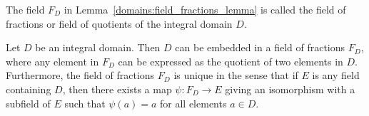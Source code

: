 \medskip

The field $F_D$ in Lemma~\ref{domains:field_fractions_lemma} is called the {\bfi field of
fractions\/} or {\bfi field of
quotients\/} of the integral domain $D$.  
 

\begin{theorem}\label{domains:field_of_quotients_ther}
Let $D$ be an integral domain.  Then $D$ can be embedded in a field of
fractions $F_D$, where any element in $F_D$ can be expressed as the
quotient of two elements in $D$.  Furthermore, the field of fractions
$F_D$ is unique in the sense that if $E$ is any field containing $D$,
then there exists a map $\psi : F_D \rightarrow E$ giving an isomorphism
with a subfield of $E$ such that $\psi(a) = a$ for all elements $a \in
D$. 
\end{theorem}
 

